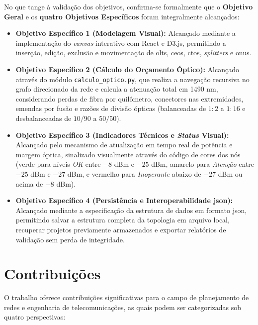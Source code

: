No que tange à validação dos objetivos, confirma-se formalmente que o \textbf{Objetivo Geral} e os \textbf{quatro Objetivos Específicos} foram integralmente alcançados:

\begin{itemize}
    \item \textbf{Objetivo Específico 1 (Modelagem Visual):} Alcançado mediante a implementação do \textit{canvas} interativo com React e D3.js, permitindo a inserção, edição, exclusão e movimentação de \glspl{olt}, \glspl{ceo}, \glspl{cto}, \textit{splitters} e \glspl{onu}.
    \item \textbf{Objetivo Específico 2 (Cálculo do Orçamento Óptico):} Alcançado através do módulo \texttt{calculo\_optico.py}, que realiza a navegação recursiva no grafo direcionado da rede e calcula a atenuação total em 1490 nm, considerando perdas de fibra por quilômetro, conectores nas extremidades, emendas por fusão e razões de divisão ópticas (balanceadas de $1:2$ a $1:16$ e desbalanceadas de $10/90$ a $50/50$).
    \item \textbf{Objetivo Específico 3 (Indicadores Técnicos e \textit{Status} Visual):} Alcançado pelo mecanismo de atualização em tempo real de potência e margem óptica, sinalizado visualmente através do código de cores dos nós (verde para níveis \textit{OK} entre $-8$ dBm e $-25$ dBm, amarelo para \textit{Atenção} entre $-25$ dBm e $-27$ dBm, e vermelho para \textit{Inoperante} abaixo de $-27$ dBm ou acima de $-8$ dBm).
    \item \textbf{Objetivo Específico 4 (Persistência e Interoperabilidade \gls{json}):} Alcançado mediante a especificação da estrutura de dados em formato \gls{json}, permitindo salvar a estrutura completa da topologia em arquivo local, recuperar projetos previamente armazenados e exportar relatórios de validação sem perda de integridade.
\end{itemize}

\section{Contribuições}

O trabalho oferece contribuições significativas para o campo de planejamento de redes e engenharia de telecomunicações, as quais podem ser categorizadas sob quatro perspectivas:


